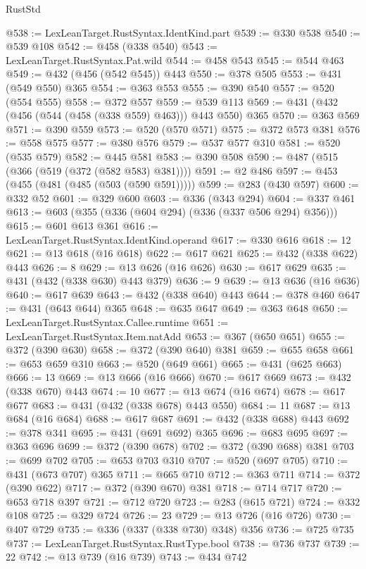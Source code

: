 \begin{lexlean}{RustStd}
\begin{coremodule}
@538 := LexLeanTarget.RustSyntax.IdentKind.part
@539 := @330 @538
@540 := @539 @108
@542 := @458 (@338 @540)
@543 := LexLeanTarget.RustSyntax.Pat.wild
@544 := @458 @543
@545 := @544 @463
@549 := @432 (@456 (@542 @545)) @443
@550 := @378 @505
@553 := @431 (@549 @550) @365
@554 := @363 @553
@555 := @390 @540
@557 := @520 (@554 @555)
@558 := @372 @557
@559 := @539 @113
@569 := @431 (@432 (@456 (@544 (@458 (@338 @559) @463))) @443 @550) @365
@570 := @363 @569
@571 := @390 @559
@573 := @520 (@570 @571)
@575 := @372 @573 @381
@576 := @558 @575
@577 := @380 @576
@579 := @537 @577 @310
@581 := @520 (@535 @579)
@582 := @445 @581
@583 := @390 @508
@590 := @487 (@515 (@366 (@519 (@372 (@582 @583) @381))))
@591 := @2 @486
@597 := @453 (@455 (@481 (@485 (@503 (@590 @591)))))
@599 := @283 (@430 @597)
@600 := @332 @52
@601 := @329 @600
@603 := @336 (@343 @294)
@604 := @337 @461
@613 := @603 (@355 (@336 (@604 @294) (@336 (@337 @506 @294) @356)))
@615 := @601 @613 @361
@616 := LexLeanTarget.RustSyntax.IdentKind.operand
@617 := @330 @616
@618 := 12
@621 := @13 @618 (@16 @618)
@622 := @617 @621
@625 := @432 (@338 @622) @443
@626 := 8
@629 := @13 @626 (@16 @626)
@630 := @617 @629
@635 := @431 (@432 (@338 @630) @443 @379)
@636 := 9
@639 := @13 @636 (@16 @636)
@640 := @617 @639
@643 := @432 (@338 @640) @443
@644 := @378 @460
@647 := @431 (@643 @644) @365
@648 := @635 @647
@649 := @363 @648
@650 := LexLeanTarget.RustSyntax.Callee.runtime
@651 := LexLeanTarget.RustSyntax.Item.natAdd
@653 := @367 (@650 @651)
@655 := @372 (@390 @630)
@658 := @372 (@390 @640) @381
@659 := @655 @658
@661 := @653 @659 @310
@663 := @520 (@649 @661)
@665 := @431 (@625 @663)
@666 := 13
@669 := @13 @666 (@16 @666)
@670 := @617 @669
@673 := @432 (@338 @670) @443
@674 := 10
@677 := @13 @674 (@16 @674)
@678 := @617 @677
@683 := @431 (@432 (@338 @678) @443 @550)
@684 := 11
@687 := @13 @684 (@16 @684)
@688 := @617 @687
@691 := @432 (@338 @688) @443
@692 := @378 @341
@695 := @431 (@691 @692) @365
@696 := @683 @695
@697 := @363 @696
@699 := @372 (@390 @678)
@702 := @372 (@390 @688) @381
@703 := @699 @702
@705 := @653 @703 @310
@707 := @520 (@697 @705)
@710 := @431 (@673 @707) @365
@711 := @665 @710
@712 := @363 @711
@714 := @372 (@390 @622)
@717 := @372 (@390 @670) @381
@718 := @714 @717
@720 := @653 @718 @397
@721 := @712 @720
@723 := @283 (@615 @721)
@724 := @332 @108
@725 := @329 @724
@726 := 23
@729 := @13 @726 (@16 @726)
@730 := @407 @729
@735 := @336 (@337 (@338 @730) @348) @356
@736 := @725 @735
@737 := LexLeanTarget.RustSyntax.RustType.bool
@738 := @736 @737
@739 := 22
@742 := @13 @739 (@16 @739)
@743 := @434 @742

\end{coremodule}
\end{lexlean}

